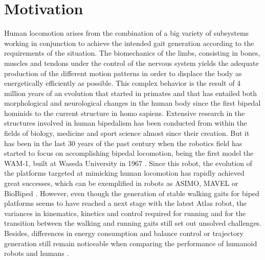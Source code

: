 \section{Motivation}
\label{sec:motivation}
Human locomotion arises from the combination of a big variety of subsystems working in conjunction to achieve the intended gait generation according to the requirements of the situation.
The biomechanics of the limbs, consisting in bones, muscles and tendons under the control of the nervous system yields the adequate production of the different motion patterns in order to displace the body as energetically efficiently as possible.
This complex behavior is the result of 4 million years of an evolution \cite{bipedalism} that started in primates and that has entailed both morphological and neurological changes in the human body since the first bipedal hominids to the current structure in homo sapiens. 
Extensive research in the structures involved in human bipedalism has been conducted from within the fields of biology, medicine and sport science almost since their creation. 
But it has been in the last 30 years of the past century when the robotics field has started to focus on accomplishing bipedal locomotion, being the first model the WAM-1, built at Waseda University in 1967 \cite{}.
Since this robot, the evolution of the platforms targeted at mimicking human locomotion has rapidly achieved great successes, which can be exemplified in robots as ASIMO, MAVEL or BioBiped \cite{}.  
However, even though the generation of stable walking gaits for biped platforms seems to have reached a next stage with the latest Atlas robot, the variances in kinematics, kinetics and control required for running and for the transition between the walking and running gaits still set out unsolved challenges.
Besides, differences in energy consumption and balance control or trajectory generation still remain noticeable when comparing the performance of humanoid robots and humans \cite{h7}.

